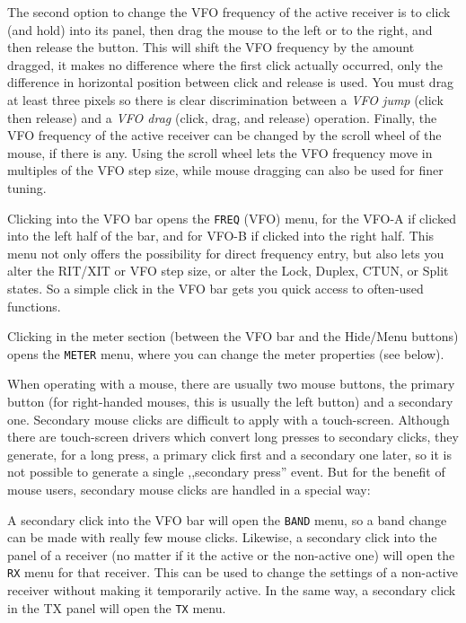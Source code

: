 \documentclass[12pt]{book}
\def\bltt#1{\texttt{\color{blue}#1}}
\begin{document}
The second option to change the VFO frequency of the active receiver
is to click (and hold) into its panel, then drag the mouse to the left
or to the right, and then release the button. This will shift the
VFO frequency by the amount dragged, it makes no difference
where the first click actually occurred, only the difference
in horizontal position between click and release is used. You must
drag at least three pixels so there is clear discrimination between
a \textit{VFO jump} (click then release) and a \textit{VFO drag} (click, drag,
and release) operation. Finally, the VFO frequency of the active
receiver can be changed by the scroll wheel of the mouse, if there
is any. Using the scroll wheel lets the VFO frequency move in multiples
of the VFO step size, while mouse dragging can also be used for
finer tuning.

Clicking into the VFO bar opens the \bltt{FREQ} (VFO) menu,
for the VFO-A if clicked into the left half of the bar, and for
VFO-B if clicked into the right half. This menu not only offers
the possibility for direct frequency entry, but also lets you
alter the RIT/XIT or VFO step size, or alter the Lock, Duplex,
CTUN, or Split states. So a simple click in the VFO bar
gets you quick access to often-used functions.

Clicking in the meter section (between the VFO bar and the
Hide/Menu buttons) opens the \bltt{METER} menu, where
you can change the meter properties (see below).

When operating with a mouse, there are usually two mouse buttons,
the primary button (for right-handed mouses, this is usually
the left button) and a secondary one. Secondary mouse clicks
are difficult to apply with a touch-screen. Although there are
touch-screen drivers which convert long presses to secondary clicks,
they generate, for a long press, a primary click first and a
secondary one later, so it is not possible to generate a
single ,,secondary press'' event. But for the benefit of
mouse users, secondary mouse clicks are handled in a special way:

A secondary click into the VFO bar will open the \bltt{BAND} menu,
so a band change can be made with really few mouse clicks. Likewise,
a secondary click into the panel of a receiver (no matter if it
the active or the non-active one) will open the \bltt{RX} menu
for that receiver. This can be used to change the settings of a
non-active receiver without making it temporarily active. In the
same way, a secondary click in the TX panel will open the
\bltt{TX} menu.
\end{document}
